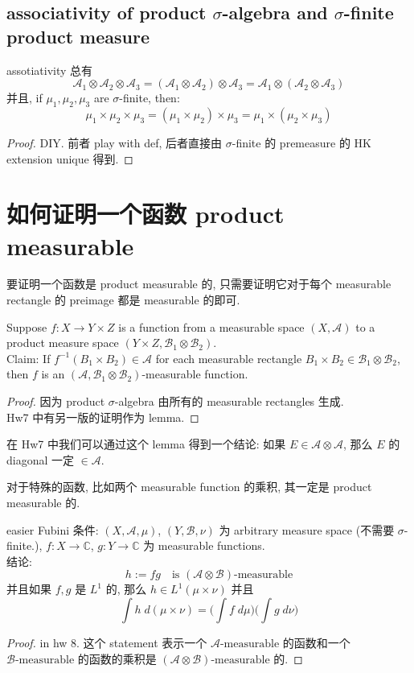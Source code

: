 \documentclass[lang=cn,11pt]{elegantbook}
\begin{document}
\subsection{associativity of product $\sigma$-algebra and $\sigma$-finite product measure}
\begin{corollary}{assotiativity}
总有 $$ \mathcal{A}_1 \otimes \mathcal{A}_2  \otimes \mathcal{A}_3 =  (\mathcal{A}_1 \otimes \mathcal{A}_2)  \otimes \mathcal{A}_3 =   \mathcal{A}_1 \otimes (\mathcal{A}_2  \otimes \mathcal{A}_3 ) $$ 并且, if $\mu_1, \mu_2,\mu_3$ are $\sigma$-finite, then: $$\mu_1 \times \mu_2 \times \mu_3 = (\mu_1 \times \mu_2) \times \mu_3  = \mu_1 \times (\mu_2 \times \mu_3 )$$
\end{corollary}
\begin{proof}
    DIY. 前者 play with def, 后者直接由 $\sigma$-finite 的 premeasure 的 HK extension unique 得到. 
\end{proof}


\section{如何证明一个函数 product measurable}

要证明一个函数是 product measurable 的, 只需要证明它对于每个  measurable rectangle 的 preimage 都是 measurable 的即可.
\begin{lemma}
    Suppose $f: X\to Y\times Z$ is a function from a measurable space $(X,\mathcal{A})$ to a product measure space $(Y\times Z, \mathcal{B}_1 \otimes \mathcal{B}_2)$.\\
  Claim: If $f^{-1}(B_1 \times B_2)\in\mathcal{A}$ for each measurable rectangle $B_1 \times B_2 \in \mathcal{B}_1 \otimes \mathcal{B}_2$, then $f$ is an $(\mathcal{A}, \mathcal{B}_1 \otimes \mathcal{B}_2)$-measurable function.
\end{lemma}
\begin{proof}
    因为 product $\sigma$-algebra 由所有的 measurable rectangles 生成. \\
    Hw7 中有另一版的证明作为 lemma.
\end{proof}
在 Hw7 中我们可以通过这个 lemma 得到一个结论: 如果 $E \in \mathcal{A\otimes A}$, 那么 $E$ 的 diagonal 一定 $\in \mathcal{A}$.


对于特殊的函数, 比如两个 measurable function 的乘积, 其一定是 product measurable 的.
\begin{lemma}{easier Fubini}
条件: $(X,\mathcal{A},\mu)$, $(Y,\mathcal{B}, \nu)$ 为 arbitrary measure space (不需要 $\sigma$-finite.), $f:X\to \mathbb{C}$, $g:Y \to \mathbb{C}$ 为 measurable functions.\\
结论: \[
h:= fg  \quad \text{is } (\mathcal{A} \otimes \mathcal{B}) \text{-measurable}
\]
并且如果 $f,g$ 是 $L^1$ 的, 那么 $h \in L^1(\mu \times \nu)$ 并且 \[
\int h \; d(\mu\times \nu) = \Big( \int f \; d\mu \Big)\Big( \int g \; d\nu \Big)
\]
\end{lemma}
\begin{proof}
     in hw 8. 这个 statement 表示一个 $\mathcal{A} \text{-measurable}$ 的函数和一个 $\mathcal{B} \text{-measurable}$ 的函数的乘积是 $(\mathcal{A} \otimes \mathcal{B}) \text{-measurable}$ 的.\end{proof}
\end{document}

